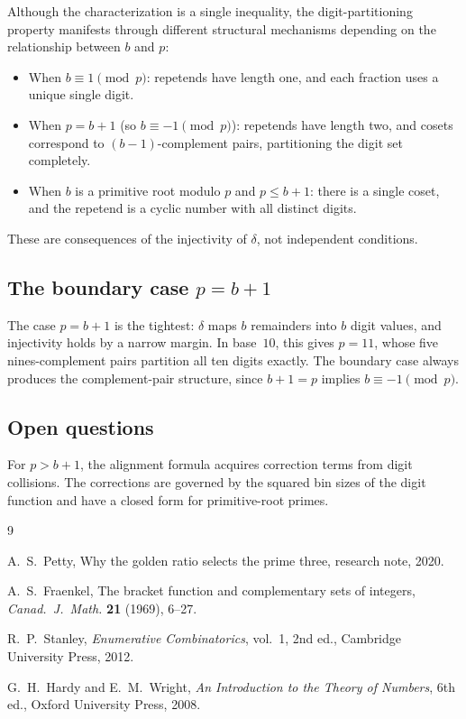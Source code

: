 \documentclass[12pt]{amsart}
\theoremstyle{definition}
\theoremstyle{remark}
\begin{document}
Although the characterization is a single inequality, the
digit-partitioning property manifests through different structural
mechanisms depending on the relationship between $b$ and $p$:

\begin{itemize}
\item When $b \equiv 1 \pmod{p}$: repetends have length one, and
      each fraction uses a unique single digit.
\item When $p = b{+}1$ (so $b \equiv -1 \pmod{p}$): repetends
      have length two, and cosets correspond to $(b{-}1)$-complement
      pairs, partitioning the digit set completely.
\item When $b$ is a primitive root modulo $p$ and $p \le b{+}1$:
      there is a single coset, and the repetend is a cyclic number
      with all distinct digits.
\end{itemize}

These are consequences of the injectivity of $\delta$, not
independent conditions.

\subsection*{The boundary case $p = b + 1$}

The case $p = b + 1$ is the tightest: $\delta$ maps $b$ remainders
into $b$ digit values, and injectivity holds by a narrow margin. In
base~$10$, this gives $p = 11$, whose five nines-complement pairs
partition all ten digits exactly. The boundary case
always produces the complement-pair structure, since
$b + 1 = p$ implies $b \equiv -1 \pmod{p}$.

\subsection*{Open questions}

For $p > b + 1$, the alignment formula acquires correction terms from
digit collisions. The corrections are governed by the squared bin sizes
of the digit function and have a closed form for primitive-root primes.

\begin{thebibliography}{9}

A.~S.~Petty,
Why the golden ratio selects the prime three,
research note, 2020.

A.~S.~Fraenkel,
The bracket function and complementary sets of integers,
\emph{Canad.\ J.\ Math.} \textbf{21} (1969), 6--27.

R.~P.~Stanley,
\emph{Enumerative Combinatorics}, vol.~1,
2nd ed., Cambridge University Press, 2012.

G.~H.~Hardy and E.~M.~Wright,
\emph{An Introduction to the Theory of Numbers},
6th ed., Oxford University Press, 2008.

\end{thebibliography}
\end{document}
